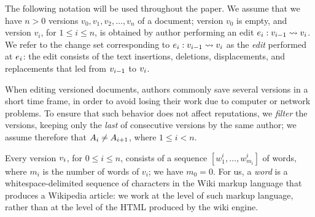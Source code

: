 
The following notation will be used throughout the paper.
We assume that we have $n > 0$ versions $v_0, v_1, v_2, \ldots, v_n$ of a
document; version $v_0$ is empty, and version $v_i$,
for $1 \leq i \leq n$, is obtained by author  performing an
edit $e_{i}: v_{i-1} \rightsquigarrow v_{i}$.
We refer to the change set corresponding to
$e_{i}: v_{i-1} \rightsquigarrow v_{i}$
as the {\em edit\/} performed at $e_{i}$: the edit consists of the text
insertions, deletions, displacements, and replacements that led from
$v_{i-1}$ to $v_{i}$.

When editing versioned documents, authors commonly save several
versions in a short time frame, in order to avoid losing their work
due to computer or network problems.
To ensure that such behavior does not affect reputations, we
\textit{filter} the versions, keeping only the \textit{last} of consecutive
versions by the same author; we assume therefore that
$A_{i} \neq A_{i+1}$,
where $1 \leq i < n$.

Every version $v_{i}$, for $0 \leq i \leq n$, consists of a sequence
$[w^i_1, \ldots, w^i_{m_i}]$ of words, where $m_i$ is the number of
words of $v_i$; we have $m_0 = 0$.
For us, a {\em word\/} is a whitespace-delimited sequence of
characters in the Wiki markup language that produces a Wikipedia article:
we work at the level of such markup language, rather than at the level
of the HTML produced by the wiki engine.


